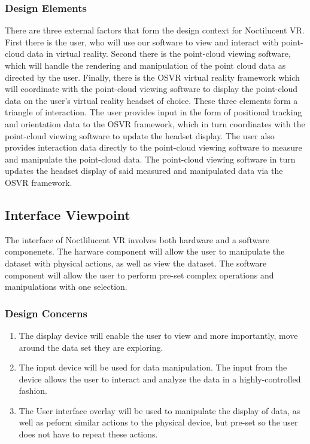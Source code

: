 \subsubsection{Design Elements}

There are three external factors that form the design context for Noctilucent VR. 
First there is the user, who will use our software to view and interact with point-cloud data in virtual reality. 
Second there is the point-cloud viewing software, which will handle the rendering and manipulation of the point cloud data as directed by the user. 
Finally, there is the OSVR virtual reality framework which will coordinate with the point-cloud viewing software to display the point-cloud data on the user’s virtual reality headset of choice. 
These three elements form a triangle of interaction. 
The user provides input in the form of positional tracking and orientation data to the OSVR framework, which in turn coordinates with the point-cloud viewing software to update the headset display. 
The user also provides interaction data directly to the point-cloud viewing software to measure and manipulate the point-cloud data. 
The point-cloud viewing software in turn updates the headset display of said measured and manipulated data via the OSVR framework.

\subsection{Interface Viewpoint}

The interface of Noctlilucent VR involves both hardware and a software componenets. 
The harware component will allow the user to manipulate the dataset with physical actions,
as well as view the dataset.
The software component will allow the user to perform pre-set complex operations and manipulations
with one selection. 

\subsubsection{Design Concerns}
\begin{enumerate}
\item The display device will enable the user to view and more importantly, move around the data set
    they are exploring.
\item The input device will be used for data manipulation. The input from the device allows the user to interact and analyze the
    data in a highly-controlled fashion.
\item The User interface overlay will be used to manipulate the display of data, as well as peform similar actions to the physical device,
    but pre-set so the user does not have to repeat these actions.
\end{enumerate}
